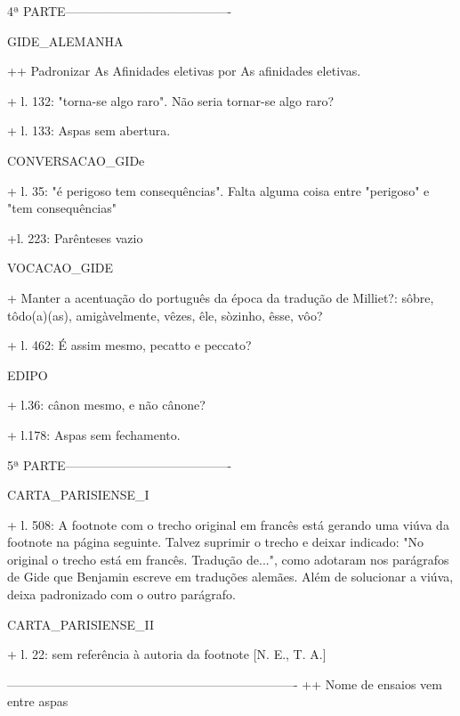 4ª PARTE----------------------------------------

GIDE_ALEMANHA

++ Padronizar As Afinidades eletivas por As afinidades eletivas.

+ l. 132: "torna-se algo raro". Não seria tornar-se algo raro?

+ l. 133: Aspas sem abertura.

CONVERSACAO_GIDe

+ l. 35: "é perigoso tem consequências". Falta alguma coisa entre "perigoso" e "tem consequências"

+l. 223: Parênteses vazio

VOCACAO_GIDE

+ Manter a acentuação do português da época da tradução de Milliet?: sôbre, tôdo(a)(as), amigàvelmente, vêzes, êle, sòzinho, êsse, vôo?

+ l. 462: É assim mesmo, pecatto e peccato?

EDIPO

+ l.36: cânon mesmo, e não cânone?

+ l.178: Aspas sem fechamento.


5ª PARTE----------------------------------------

CARTA_PARISIENSE_I

+ l. 508: A footnote com o trecho original em francês está gerando uma viúva da footnote na página seguinte. Talvez suprimir o trecho e deixar indicado: "No original o trecho está em francês. Tradução de...", como adotaram nos parágrafos de Gide que Benjamin escreve em traduções alemães. Além de solucionar a viúva, deixa padronizado com o outro parágrafo.


CARTA_PARISIENSE_II

+ l. 22: sem referência à autoria da footnote [N. E., T. A.]



----------------------------------------------------------------------
++ Nome de ensaios vem entre aspas